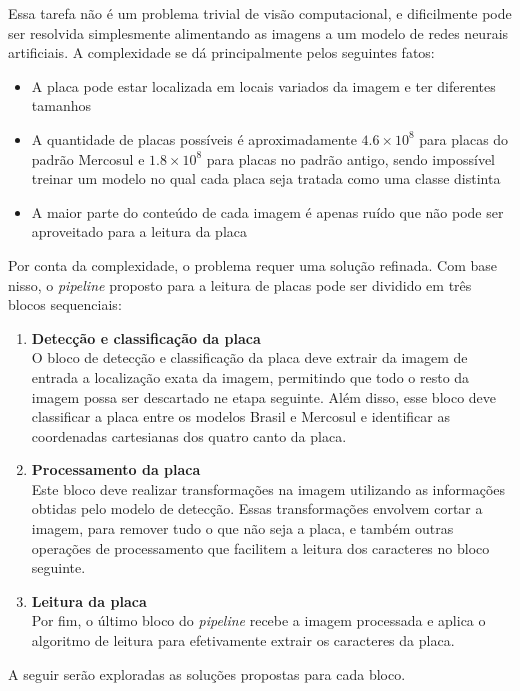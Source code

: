 Essa tarefa não é um problema trivial de visão computacional, e dificilmente pode ser resolvida simplesmente alimentando as imagens a um modelo de redes neurais artificiais. A complexidade se dá principalmente pelos seguintes fatos:

\begin{itemize}
    \item A placa pode estar localizada em locais variados da imagem e ter diferentes tamanhos
    \item A quantidade de placas possíveis é aproximadamente $4.6 \times 10^8$ para placas do padrão Mercosul e $1.8 \times 10^8$ para placas no padrão antigo, sendo impossível treinar um modelo no qual cada placa seja tratada como uma classe distinta
    \item A maior parte do conteúdo de cada imagem é apenas ruído que não pode ser aproveitado para a leitura da placa
\end{itemize}

Por conta da complexidade, o problema requer uma solução refinada. Com base nisso, o \textit{pipeline} proposto para a leitura de placas pode ser dividido em três blocos sequenciais:

\begin{enumerate}
    \item \textbf{Detecção e classificação da placa} \\
    O bloco de detecção e classificação da placa deve extrair da imagem de entrada a localização exata da imagem, permitindo que todo o resto da imagem possa ser descartado ne etapa seguinte. Além disso, esse bloco deve classificar a placa entre os modelos Brasil e Mercosul e identificar as coordenadas cartesianas dos quatro canto da placa.
    \item \textbf{Processamento da placa} \\
    Este bloco deve realizar transformações na imagem utilizando as informações obtidas pelo modelo de detecção. Essas transformações envolvem cortar a imagem, para remover tudo o que não seja a placa, e também outras operações de processamento que facilitem a leitura dos caracteres no bloco seguinte.
    \item \textbf{Leitura da placa} \\
    Por fim, o último bloco do \textit{pipeline} recebe a imagem processada e aplica o algoritmo de leitura para efetivamente extrair os caracteres da placa.
\end{enumerate}

A seguir serão exploradas as soluções propostas para cada bloco.

